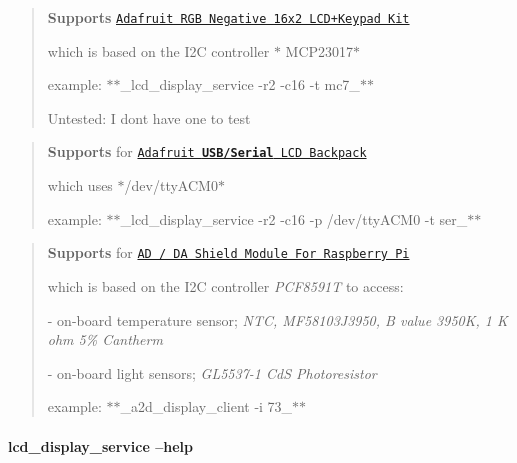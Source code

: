 \begin{quote}
{\bfseries Supports} \href{https://www.adafruit.com/products/1110}{\tt \textquotesingle{}Adafruit R\+GB Negative 16x2 L\+C\+D+\+Keypad Kit\textquotesingle{}}
\begin{DoxyItemize}
\item which is based on the I2C controller $\ast$ M\+C\+P23017$\ast$
\item example\+: $\ast$$\ast$\+\_\+lcd\+\_\+display\+\_\+service -\/r2 -\/c16 -\/t mc7\+\_\+$\ast$$\ast$
\item Untested\+: I don\textquotesingle{}t have one to test 
\end{DoxyItemize}\end{quote}


\begin{quote}
{\bfseries Supports} for \href{https://www.adafruit.com/products/782}{\tt \textquotesingle{}Adafruit {\bfseries U\+S\+B/\+Serial} L\+CD Backpack\textquotesingle{}}
\begin{DoxyItemize}
\item which uses $\ast$/dev/tty\+A\+C\+M0$\ast$
\item example\+: $\ast$$\ast$\+\_\+lcd\+\_\+display\+\_\+service -\/r2 -\/c16 -\/p /dev/tty\+A\+C\+M0 -\/t ser\+\_\+$\ast$$\ast$ 
\end{DoxyItemize}\end{quote}


\begin{quote}
{\bfseries Supports} for \href{http://www.amazon.com/Shield-Module-For-Raspberry-Arduino/dp/B00WGW48A8}{\tt \textquotesingle{}AD / DA Shield Module For Raspberry Pi\textquotesingle{}}
\begin{DoxyItemize}
\item which is based on the I2C controller {\itshape P\+C\+F8591T} to access\+:
\item -\/ on-\/board temperature sensor; {\itshape N\+TC, M\+F58103\+J3950, B value 3950K, 1 K ohm 5\% Cantherm}
\item -\/ on-\/board light sensors; {\itshape G\+L5537-\/1 CdS Photoresistor}
\item example\+: $\ast$$\ast$\+\_\+a2d\+\_\+display\+\_\+client -\/i 73\+\_\+$\ast$$\ast$ 
\end{DoxyItemize}\end{quote}


\paragraph*{lcd\+\_\+display\+\_\+service --help}

